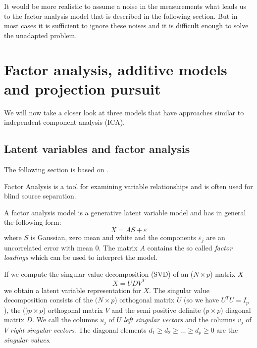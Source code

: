 \documentclass[12pt, a4paper]{article}
\numberwithin{equation}{section}
\numberwithin{figure}{section}
\numberwithin{table}{section}
\begin{document}
	It would be more realistic to assume a noise in the measurements what leads us to the factor analysis model that is described in the following section.
	But in most cases it is sufficient to ignore these noises and it is difficult enough to solve the unadapted problem.
	\newpage
	
	\section{Factor analysis, additive models and projection pursuit} 
	We will now take a closer look at three models that have approaches similar to independent component analysis (ICA). %
	\subsection{Latent variables and factor analysis} \label{factoranalysis}
	The following section is based on \citet{elementsofstatisticallearning}.
	
	Factor Analysis is a tool for examining variable relationships and is often used for blind source separation.
	
	A factor analysis model is a generative latent variable model and has in general the following form: %
	\begin{equation}
	X=AS+\varepsilon
	\end{equation}
	where $S$ is Gaussian, zero mean and white and  the components $\varepsilon_j$ are an uncorrelated error with mean 0.
	The matrix $A$ contains the so called \textit{factor loadings} which can be used to interpret the model. %
	
	If we compute the singular value decomposition (SVD) of an \mbox{($N\times p$)} matrix $X$
	\begin{equation} \label{svd}
	X = UDV^T
	\end{equation}
	we obtain a latent variable representation for $X$.
	The singular value decomposition consists of the \mbox{$(N \times p$)} orthogonal matrix $U$ (so we have \mbox{$U^TU=I_p$}), the \mbox{()$p\times p$)} orthogonal matrix $V$ and the semi positive definite \mbox{($p \times p$)} diagonal matrix $D$.
	We call the columns \mbox{$u_j$} of $U$ \textit{left singular vectors} and the columns \mbox{$v_j$} of $V$ \textit{right singular vectors}.
	The diagonal elements \mbox{$d_1 \geq d_2 \geq \dots \geq d_p \geq 0$} are the \textit{singular values}.
	
\end{document}
